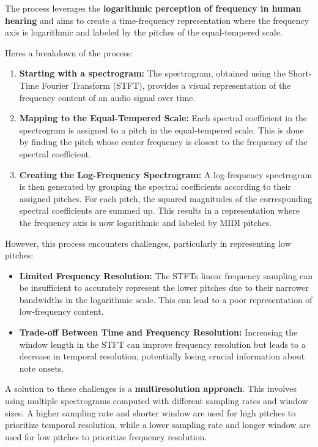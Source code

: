 \documentclass[a4paper, 9pt, twocolumn]{extarticle}
\begin{document}
The process leverages the \textbf{logarithmic perception of frequency in
human hearing} and aims to create a time-frequency representation where
the frequency axis is logarithmic and labeled by the pitches of the
equal-tempered scale.

Here\textquotesingle s a breakdown of the process:

\begin{enumerate}
\def\labelenumi{\arabic{enumi}.}
\item
  \textbf{Starting with a spectrogram:} The spectrogram, obtained using
  the Short-Time Fourier Transform (STFT), provides a visual
  representation of the frequency content of an audio signal over time.
\item
  \textbf{Mapping to the Equal-Tempered Scale:} Each spectral
  coefficient in the spectrogram is assigned to a pitch in the
  equal-tempered scale. This is done by finding the pitch whose center
  frequency is closest to the frequency of the spectral coefficient.
\item
  \textbf{Creating the Log-Frequency Spectrogram:} A log-frequency
  spectrogram is then generated by grouping the spectral coefficients
  according to their assigned pitches. For each pitch, the squared
  magnitudes of the corresponding spectral coefficients are summed up.
  This results in a representation where the frequency axis is now
  logarithmic and labeled by MIDI pitches.
\end{enumerate}

However, this process encounters challenges, particularly in
representing low pitches:

\begin{itemize}
    \item
      \textbf{Limited Frequency Resolution:} The STFT\textquotesingle s
      linear frequency sampling can be insufficient to accurately represent
      the lower pitches due to their narrower bandwidths in the logarithmic
      scale. This can lead to a poor representation of low-frequency
      content.
    \item
      \textbf{Trade-off Between Time and Frequency Resolution:} Increasing
      the window length in the STFT can improve frequency resolution but
      leads to a decrease in temporal resolution, potentially losing crucial
      information about note onsets.
    \end{itemize}
    
    A solution to these challenges is a \textbf{multiresolution approach}.
    This involves using multiple spectrograms computed with different
    sampling rates and window sizes. A higher sampling rate and shorter
    window are used for high pitches to prioritize temporal resolution,
    while a lower sampling rate and longer window are used for low pitches
    to prioritize frequency resolution.
    
\end{document}
